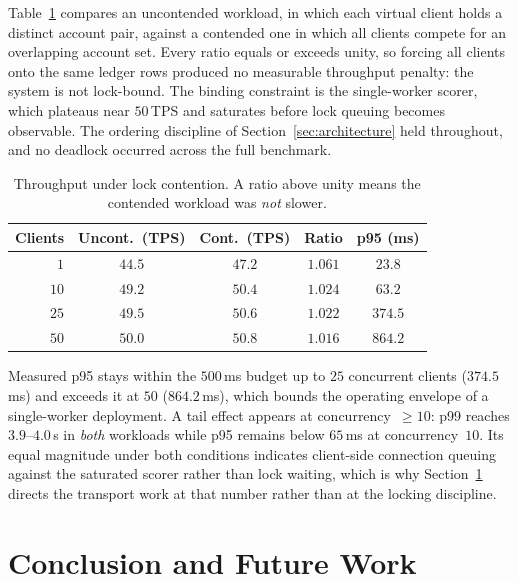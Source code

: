 \documentclass[conference]{IEEEtran}
\begin{document}
Table~\ref{tab:contention} compares an uncontended workload, in which
each virtual client holds a distinct account pair, against a contended
one in which all clients compete for an overlapping account set. Every
ratio equals or exceeds unity, so forcing all clients onto the same
ledger rows produced no measurable throughput penalty: the system is
not lock-bound. The binding constraint is the single-worker scorer,
which plateaus near $50$\,TPS and saturates before lock queuing becomes
observable. The ordering discipline of
Section~\ref{sec:architecture} held throughout, and no deadlock
occurred across the full benchmark.

\begin{table}[t]
\centering
\caption{Throughput under lock contention. A ratio above unity means
the contended workload was \emph{not} slower.}
\label{tab:contention}
\renewcommand{\arraystretch}{1.12}
\footnotesize
\setlength{\tabcolsep}{5pt}
\begin{tabular}{@{}rcccc@{}}
\toprule
\textbf{Clients} & \textbf{Uncont.\ (TPS)} & \textbf{Cont.\ (TPS)} & \textbf{Ratio} & \textbf{p95 (ms)} \\
\midrule
$1$  & $44.5$ & $47.2$ & $1.061$ & $23.8$  \\
$10$ & $49.2$ & $50.4$ & $1.024$ & $63.2$  \\
$25$ & $49.5$ & $50.6$ & $1.022$ & $374.5$ \\
$50$ & $50.0$ & $50.8$ & $1.016$ & $864.2$ \\
\bottomrule
\end{tabular}
\end{table}

Measured p95 stays within the $500$\,ms budget up to $25$ concurrent
clients ($374.5$\,ms) and exceeds it at $50$ ($864.2$\,ms), which
bounds the operating envelope of a single-worker deployment. A tail
effect appears at concurrency~$\geq 10$: p99 reaches $3.9$--$4.0$\,s in
\emph{both} workloads while p95 remains below $65$\,ms at
concurrency~$10$. Its equal magnitude under both conditions indicates
client-side connection queuing against the saturated scorer rather than
lock waiting, which is why Section~\ref{sec:conclusion} directs the
transport work at that number rather than at the locking discipline.

\section{Conclusion and Future Work}
\label{sec:conclusion}
\end{document}

